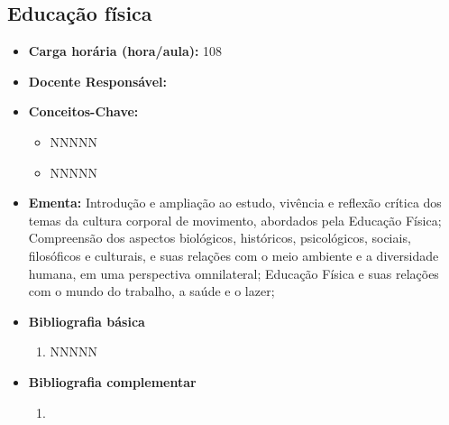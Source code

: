 \documentclass[11pt,fleqn]{book} %
\begin{document}
\subsection{Educação física}\label{disc:educacaofisica}
\begin{itemize}
	\item \textbf{Carga horária (hora/aula):} 108
	\item \textbf{Docente Responsável:}
	\item \textbf{Conceitos-Chave:}
	\begin{itemize}
		\item NNNNN
		\item NNNNN
	\end{itemize}
	\item \textbf{Ementa:} Introdução e ampliação ao estudo, vivência e reflexão crítica dos temas da cultura corporal de movimento, abordados pela Educação Física;
	Compreensão dos aspectos biológicos, históricos, psicológicos, sociais, filosóficos e culturais, e suas relações com o meio ambiente e a diversidade humana, em uma perspectiva omnilateral;
	Educação Física e suas relações com o mundo do trabalho, a saúde e o lazer;
	\item \textbf{Bibliografia básica}
	\begin{enumerate}
		\item NNNNN
	\end{enumerate}
	\item \textbf{Bibliografia complementar}
	\begin{enumerate}
		\item 
	\end{enumerate}	
\end{itemize}


\newpage
\end{document}
